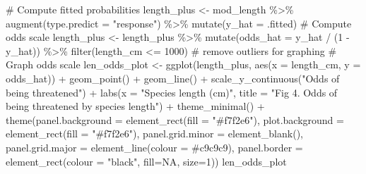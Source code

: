 \documentclass[
  letterpaper,
  DIV=11,
  numbers=noendperiod]{scrartcl}
\newenvironment{Shaded}{\begin{snugshade}}{\end{snugshade}}
\newcommand{\AttributeTok}[1]{\textcolor[rgb]{0.40,0.45,0.13}{#1}}
\newcommand{\CommentTok}[1]{\textcolor[rgb]{0.37,0.37,0.37}{#1}}
\newcommand{\ConstantTok}[1]{\textcolor[rgb]{0.56,0.35,0.01}{#1}}
\newcommand{\DecValTok}[1]{\textcolor[rgb]{0.68,0.00,0.00}{#1}}
\newcommand{\FunctionTok}[1]{\textcolor[rgb]{0.28,0.35,0.67}{#1}}
\newcommand{\NormalTok}[1]{\textcolor[rgb]{0.00,0.23,0.31}{#1}}
\newcommand{\OtherTok}[1]{\textcolor[rgb]{0.00,0.23,0.31}{#1}}
\newcommand{\SpecialCharTok}[1]{\textcolor[rgb]{0.37,0.37,0.37}{#1}}
\newcommand{\StringTok}[1]{\textcolor[rgb]{0.13,0.47,0.30}{#1}}
\begin{document}
\begin{Shaded}
\begin{Highlighting}[]
\CommentTok{\# Compute fitted probabilities}
\NormalTok{length\_plus }\OtherTok{\textless{}{-}}\NormalTok{ mod\_length }\SpecialCharTok{\%\textgreater{}\%}
  \FunctionTok{augment}\NormalTok{(}\AttributeTok{type.predict =} \StringTok{"response"}\NormalTok{) }\SpecialCharTok{\%\textgreater{}\%}
  \FunctionTok{mutate}\NormalTok{(}\AttributeTok{y\_hat =}\NormalTok{ .fitted)}
\CommentTok{\# Compute odds scale}
\NormalTok{length\_plus }\OtherTok{\textless{}{-}}\NormalTok{ length\_plus }\SpecialCharTok{\%\textgreater{}\%} 
  \FunctionTok{mutate}\NormalTok{(}\AttributeTok{odds\_hat =}\NormalTok{ y\_hat }\SpecialCharTok{/}\NormalTok{ (}\DecValTok{1} \SpecialCharTok{{-}}\NormalTok{ y\_hat)) }\SpecialCharTok{\%\textgreater{}\%} 
  \FunctionTok{filter}\NormalTok{(length\_cm }\SpecialCharTok{\textless{}=} \DecValTok{1000}\NormalTok{) }\CommentTok{\# remove outliers for graphing}
\CommentTok{\# Graph odds scale}
\NormalTok{len\_odds\_plot }\OtherTok{\textless{}{-}} \FunctionTok{ggplot}\NormalTok{(length\_plus, }\FunctionTok{aes}\NormalTok{(}\AttributeTok{x =}\NormalTok{ length\_cm, }
                                         \AttributeTok{y =}\NormalTok{ odds\_hat)) }\SpecialCharTok{+}
  \FunctionTok{geom\_point}\NormalTok{() }\SpecialCharTok{+} 
  \FunctionTok{geom\_line}\NormalTok{() }\SpecialCharTok{+} 
  \FunctionTok{scale\_y\_continuous}\NormalTok{(}\StringTok{"Odds of being threatened"}\NormalTok{) }\SpecialCharTok{+}
  \FunctionTok{labs}\NormalTok{(}\AttributeTok{x =} \StringTok{"Species length (cm)"}\NormalTok{, }
       \AttributeTok{title =} \StringTok{"Fig 4. Odds of being threatened by species length"}\NormalTok{) }\SpecialCharTok{+}
  \FunctionTok{theme\_minimal}\NormalTok{() }\SpecialCharTok{+}
  \FunctionTok{theme}\NormalTok{(}\AttributeTok{panel.background =} \FunctionTok{element\_rect}\NormalTok{(}\AttributeTok{fill =} \StringTok{"\#f7f2e6"}\NormalTok{),}
        \AttributeTok{plot.background =} \FunctionTok{element\_rect}\NormalTok{(}\AttributeTok{fill =} \StringTok{"\#f7f2e6"}\NormalTok{),}
        \AttributeTok{panel.grid.minor =} \FunctionTok{element\_blank}\NormalTok{(),}
        \AttributeTok{panel.grid.major =} \FunctionTok{element\_line}\NormalTok{(}\AttributeTok{colour =} \StringTok{\textquotesingle{}\#c9c9c9\textquotesingle{}}\NormalTok{),}
        \AttributeTok{panel.border =} \FunctionTok{element\_rect}\NormalTok{(}\AttributeTok{colour =} \StringTok{"black"}\NormalTok{, }\AttributeTok{fill=}\ConstantTok{NA}\NormalTok{, }\AttributeTok{size=}\DecValTok{1}\NormalTok{))}
\NormalTok{len\_odds\_plot}
\end{Highlighting}
\end{Shaded}
\end{document}
